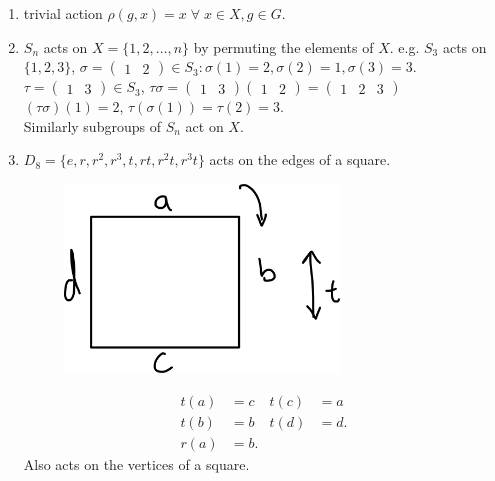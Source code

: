 \begin{example} \label{exm:actions} \mbox{}
    \begin{enumerate} \def\labelenumi{\roman{enumi}.} \def\labelenumii{\arabic{enumii}.} 
        \item trivial action $\rho(g, x) = x \; \forall \; x \in X, g \in G$.
        \item $S_n$ acts on $X = \{ 1, 2, \ldots, n \}$ by permuting the elements of $X$.
        e.g. $S_3$ acts on $\{1, 2, 3\}$, $\sigma = \begin{pmatrix}1 & 2\end{pmatrix} \in S_3 : \sigma(1) = 2, \sigma(2) = 1, \sigma(3) = 3$.
        $\tau = \begin{pmatrix}1 & 3\end{pmatrix} \in S_3$, $\tau \sigma = \begin{pmatrix}1 & 3\end{pmatrix} \begin{pmatrix}1 & 2\end{pmatrix} = \begin{pmatrix}1 & 2 & 3\end{pmatrix}$ \\
        $(\tau \sigma)(1) = 2$, $\tau(\sigma(1)) = \tau(2) = 3$. \\
        Similarly subgroups of $S_n$ act on $X$.
        \item $D_8 = \{e, r, r^2, r^3, t, rt, r^2t, r^3t \}$ acts on the edges of a square.
        \begin{figure}
            \centering 
            \includegraphics[height=5cm]{figures/06-square-action}
        \end{figure} 
        \begin{align*}
            t(a) &= c & t(c) &= a \\
            t(b) &= b & t(d) &= d. \\
            r(a) &= b.
        \end{align*} 
        Also acts on the vertices of a square.
        \begin{figure}

\end{figure}
\end{enumerate}
\end{example}
